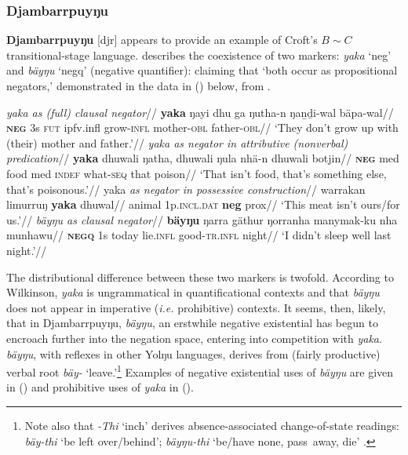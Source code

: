 {\subsubsection{Djambarrpuyŋu}\label{sec:nec-djr} \textbf{Djambarrpuyŋu} [\gls{djr}] appears to provide an example of Croft's $B\sim C$ transitional-stage language. \citet[356]{Wilkinson1991} describes the coexistence of two markers: \textit{yaka} `\gls{neg}' and \textit{bäyŋu} `\gls{negq}' (negative quantifier): claiming that `both occur as propositional negators,' demonstrated in the data in (\nextx) below, from \citet{Wilkinson1991}.

\pex
\a\begingl\glpreamble \textit{{\em yaka} as (full) clausal negator}//
\gla \textbf{yaka} ŋayi dhu ga ŋutha-n ŋaṉḏi-wal bäpa-wal//
\glb \textsc{\textbf{neg}} 3\gls{s} \textsc{fut} \gls{ipfv}.\gls{infl} grow-\textsc{infl} mother\textsc{-obl} father\textsc{-obl}//
\glft `They don't grow up with (their) mother and father.'//
\endgl
\a\begingl\glpreamble \textit{{\em yaka} as negator in attributive (nonverbal) predication}//
\gla \textbf{yaka} dhuwali ŋatha, dhuwali ŋula nhä-n dhuwali botjin//
\glb \textsc{\textbf{neg}} \gls{med} food \gls{med} \textsc{indef} what-\textsc{seq} that poison//
\glft`That isn't food, that's something else, that's poisonous.'//\endgl
\a\begingl\glpreamble yaka \textit{as negator in possessive construction}//
\gla warrakan limurruŋ \textbf{yaka} dhuwal//
\glb animal 1\gls{p}.\textsc{incl.dat} \textbf{\gls{neg}} \gls{prox}//
\glft`This meat isn't ours/for us.'\trailingcitation{[AW~20190505]}//
\endgl
\a\begingl
\glpreamble\textit{ {\em bäyŋu} as clausal negator}//
\gla \textbf{bäyŋu} ŋarra gäthur ŋorranha manymak-ku	nha munhawu//
\glb \textsc{\textbf{negq}} 1\gls{s} today lie\textsc{.infl} good-\textsc{tr.infl} night//
\glft `I didn't sleep well last night.'\hfill\citep[357]{Wilkinson1991}//
\endgl{}\xe

The distributional difference between these two markers is twofold. According to Wilkinson, \textit{yaka} is ungrammatical in quantificational contexts and that \textit{bäyŋu} does not appear in imperative (\textit{i.e.} prohibitive) contexts. It seems, then, likely, that in Djambarrpuyŋu, \textit{bäyŋu}, an erstwhile negative existential has begun to encroach further into the negation space, entering into competition with \textit{yaka}. \textit{bäyŋu}, with reflexes in other Yolŋu languages, derives from (fairly productive) verbal root \textit{bäy-} `leave.'\footnote{Note also that \textit{-Thi} `\gls{inch}' derives absence-associated change-of-state readings: \textit{bäy-thi} `be left over/behind'; \textit{bäyŋu-thi} `be/have none, pass~away, die' \citep[378]{Wilkinson1991}.} Examples of negative existential uses of \textit{bäyŋu} are given in (\nextx) and prohibitive uses of \textit{yaka} in (\anextx).


}
